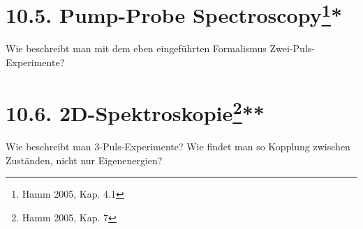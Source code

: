 \section{10.5. Pump-Probe Spectroscopy\protect\footnote{Hamm 2005,  Kap. 4.1}\hfill **} 

Wie beschreibt man mit dem eben eingeführten Formalismus
Zwei-Puls-Experimente?


\section{10.6. {2D}-Spektroskopie\protect\footnote{Hamm 2005, Kap. 7}\hfill ***} 

Wie beschreibt man 3-Puls-Experimente? Wie findet man so
Kopplung zwischen Zuständen, nicht nur Eigenenergien?
 
